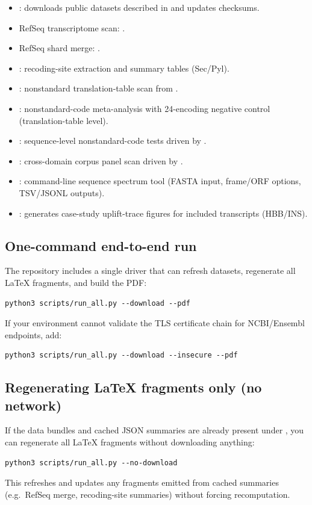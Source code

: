 \begin{itemize}
\item {}: downloads public datasets described in  and updates checksums.
\item RefSeq transcriptome scan: .
\item RefSeq shard merge: .
\item {}: recoding-site extraction and summary tables (Sec/Pyl).
\item {}: nonstandard translation-table scan from .
\item {}: nonstandard-code meta-analysis with 24-encoding negative control (translation-table level).
\item {}: sequence-level nonstandard-code tests driven by .
\item {}: cross-domain corpus panel scan driven by .
\item {}: command-line sequence spectrum tool (FASTA input, frame/ORF options, TSV/JSONL outputs).
\item {}: generates case-study uplift-trace figures for included transcripts (HBB/INS).
\end{itemize}

\subsection{One-command end-to-end run}
The repository includes a single driver that can refresh datasets, regenerate all LaTeX fragments, and build the PDF:
\begin{verbatim}
python3 scripts/run_all.py --download --pdf
\end{verbatim}
If your environment cannot validate the TLS certificate chain for NCBI/Ensembl endpoints, add:
\begin{verbatim}
python3 scripts/run_all.py --download --insecure --pdf
\end{verbatim}

\subsection{Regenerating LaTeX fragments only (no network)}
If the data bundles and cached JSON summaries are already present under , you can regenerate all LaTeX fragments without downloading anything:
\begin{verbatim}
python3 scripts/run_all.py --no-download
\end{verbatim}
This refreshes  and updates any fragments emitted from cached summaries (e.g.\ RefSeq merge, recoding-site summaries) without forcing recomputation.

